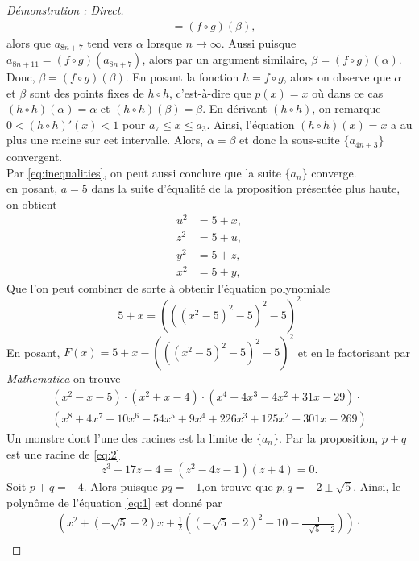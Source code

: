 \begin{proof}[Démonstration : Direct]
\begin{align*}
		& =(f\circ g)(\beta),
	\end{align*}
	alors que \(a_{8n+7}\) tend vers \(\alpha\) lorsque \(n\to\infty\). Aussi puisque \(a_{8n+11}=(f\circ g)(a_{8n+7})\), alors par un argument similaire, \(\beta=(f\circ g)(\alpha)\).\\
	Donc, \(\beta=(f\circ g)(\beta)\). En posant la fonction \(h=f\circ g\), alors on observe que \(\alpha\) et \(\beta\) sont des points fixes de \(h\circ h\), c'est-à-dire que \(p(x)=x\) où dans ce cas \((h\circ h)(\alpha)=\alpha\) et \((h\circ h)(\beta)=\beta\). En dérivant \((h\circ h)\), on remarque \(0<(h\circ h)'(x)<1\) pour \(a_7\leq x\leq a_3\). Ainsi, l'équation \((h\circ h)(x)=x\) a au plus une racine sur cet intervalle. Alors, \(\alpha=\beta\) et donc la sous-suite \(\{a_{4n+3}\}\) convergent.\\
	Par \eqref{eq:inequalities}, on peut aussi conclure que la suite \(\{a_n\}\) converge.\\
	en posant, \(a=5\) dans la suite d'équalité de la proposition présentée plus haute, on obtient
	\begin{align*}
		u^2&=5+x,\\
		z^2&=5+u,\\
		y^2&=5+z,\\
		x^2&=5+y,		
	\end{align*}
	Que l'on peut combiner de sorte à obtenir l'équation polynomiale
	\begin{equation}\label{eq:4}
		5+x=(((x^2-5)^2-5)^2-5)^2
	\end{equation}
	En posant, \(F(x)=5+x-(((x^2-5)^2-5)^2-5)^2\) et en le factorisant par \textit{Mathematica} on trouve
	\begin{multline*}
		\left(x^2-x-5\right)\cdot\left(x^2+x-4\right)\cdot\left(x^4-4 x^3-4 x^2+31 x-29\right)\cdot\\
		\left(x^8+4 x^7-10 x^6-54 x^5+9 x^4+226 x^3+125 x^2-301 x-269\right)
	\end{multline*}
	Un monstre dont l'une des racines est la limite de \(\{a_n\}\). Par la proposition, \(p+q\) est une racine de \eqref{eq:2}
	\begin{equation*}
		z^3-17z-4=(z^2-4z-1)(z+4)=0.
	\end{equation*}
	Soit \(p+q=-4\). Alors puisque \(pq=-1\),on trouve que \(p,q=-2\pm\sqrt{5}\). Ainsi, le polynôme de l'équation \eqref{eq:1} est donné par
	\begin{align*}
		\left(x^2+\left(-\sqrt{5}-2\right) x+\frac{1}{2} \left(\left(-\sqrt{5}-2\right)^2-10-\frac{1}{-\sqrt{5}-2}\right)\right)\cdot\\

\end{align*}
\end{proof}
